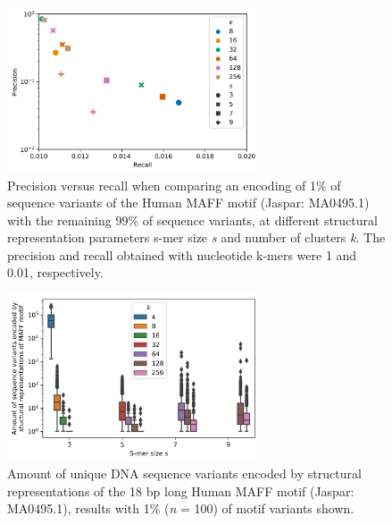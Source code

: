 \documentclass[10pt]{article}
\begin{document}
\begin{figure}[ht]
  \centering
  \includegraphics[width=7.5cm,keepaspectratio]{smer_fig_prc.png}
  \caption{Precision versus recall when comparing an encoding of 1\% of sequence variants of the Human MAFF motif (Jaspar: MA0495.1) with the remaining 99\% of sequence variants, at different structural representation parameters s-mer size \textit{s} and number of clusters \textit{k}. The precision and recall obtained with nucleotide k-mers were 1 and 0.01, respectively.}
\end{figure}

\begin{figure}[ht]
  \centering
  \includegraphics[width=7.5cm,keepaspectratio]{smer_fig_variants.png}
  \caption{Amount of unique DNA sequence variants encoded by structural representations of the 18 bp long Human MAFF motif (Jaspar: MA0495.1), results with 1\% (\textit{n} = 100) of motif variants shown.}
\end{figure}
\end{document}
